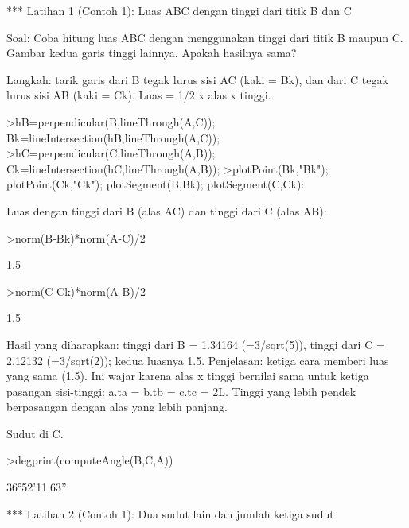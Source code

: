 \documentclass[a4paper,10pt]{article}
\begin{document}
\begin{eulernotebook}
\begin{eulercomment}
\begin{eulercomment}
\begin{eulercomment}
\begin{eulercomment}
\begin{eulercomment}
*** Latihan 1 (Contoh 1): Luas ABC dengan tinggi dari titik B dan C

Soal: Coba hitung luas ABC dengan menggunakan tinggi dari titik B maupun C.
Gambar kedua garis tinggi lainnya. Apakah hasilnya sama?

Langkah: tarik garis dari B tegak lurus sisi AC (kaki = Bk), dan dari C tegak lurus
sisi AB (kaki = Ck). Luas = 1/2 x alas x tinggi.
\end{eulercomment}
\begin{eulerprompt}
>hB=perpendicular(B,lineThrough(A,C)); Bk=lineIntersection(hB,lineThrough(A,C));
>hC=perpendicular(C,lineThrough(A,B)); Ck=lineIntersection(hC,lineThrough(A,B));
>plotPoint(Bk,"Bk"); plotPoint(Ck,"Ck"); plotSegment(B,Bk); plotSegment(C,Ck):
\end{eulerprompt}
\begin{eulercomment}
Luas dengan tinggi dari B (alas AC) dan tinggi dari C (alas AB):
\end{eulercomment}
\begin{eulerprompt}
>norm(B-Bk)*norm(A-C)/2
\end{eulerprompt}
\begin{euleroutput}
  1.5
\end{euleroutput}
\begin{eulerprompt}
>norm(C-Ck)*norm(A-B)/2
\end{eulerprompt}
\begin{euleroutput}
  1.5
\end{euleroutput}
\begin{eulercomment}
Hasil yang diharapkan: tinggi dari B = 1.34164 (=3/sqrt(5)), tinggi dari C = 2.12132
(=3/sqrt(2)); kedua luasnya 1.5.
Penjelasan: ketiga cara memberi luas yang sama (1.5). Ini wajar karena
alas x tinggi bernilai sama untuk ketiga pasangan sisi-tinggi: a.ta = b.tb = c.tc = 2L.
Tinggi yang lebih pendek berpasangan dengan alas yang lebih panjang.

Sudut di C.
\end{eulercomment}
\begin{eulerprompt}
>degprint(computeAngle(B,C,A))
\end{eulerprompt}
\begin{euleroutput}
  36°52'11.63''
\end{euleroutput}
\begin{eulercomment}
*** Latihan 2 (Contoh 1): Dua sudut lain dan jumlah ketiga sudut


\end{eulercomment}
\end{eulercomment}
\end{eulercomment}
\end{eulercomment}
\end{eulercomment}
\end{eulernotebook}
\end{document}
